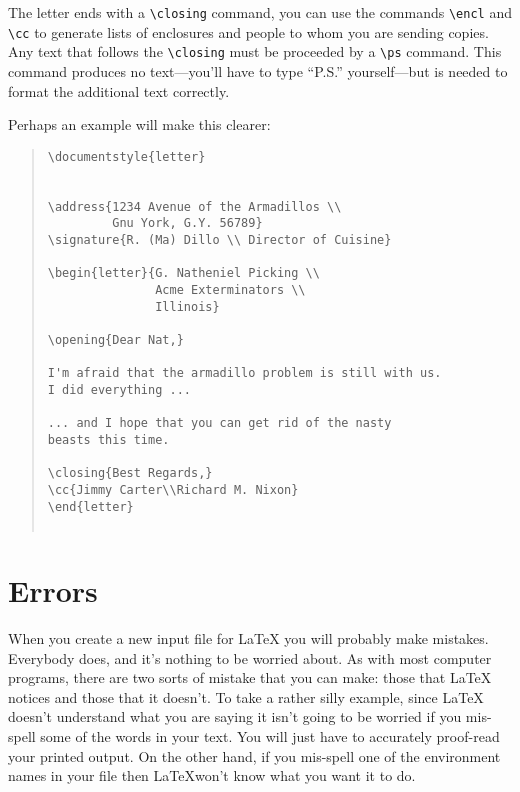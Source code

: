 The letter ends with a \verb|\closing| command, you can use the commands
\verb|\encl| and \verb|\cc| to generate lists of enclosures and people to whom
you are sending copies. Any text that follows the \verb|\closing| must be
proceeded by a \verb|\ps| command.  This command produces no text---you'll have
to type ``P.S.'' yourself---but is needed to format the additional text
correctly.

Perhaps an example will make this clearer:
\begin{quote}\footnotesize\begin{verbatim}
\documentstyle{letter}


\address{1234 Avenue of the Armadillos \\
         Gnu York, G.Y. 56789}
\signature{R. (Ma) Dillo \\ Director of Cuisine}

\begin{letter}{G. Natheniel Picking \\
               Acme Exterminators \\
               Illinois}

\opening{Dear Nat,}

I'm afraid that the armadillo problem is still with us.
I did everything ...

... and I hope that you can get rid of the nasty
beasts this time.

\closing{Best Regards,}
\cc{Jimmy Carter\\Richard M. Nixon}
\end{letter}


\end{verbatim}\end{quote}

\section{Errors}

When you create a new input file for \LaTeX{} you will probably make mistakes.
Everybody does, and it's nothing to be worried about.  As with most computer
programs, there are two sorts of mistake that you can make: those that \LaTeX{}
notices and those that it doesn't.  To take a rather silly example, since
\LaTeX{} doesn't understand what you are saying it isn't going to be worried if
you mis-spell some of the words in your text.  You will just have to accurately
proof-read your printed output.  On the other hand, if you mis-spell one of
the environment names in your file then \LaTeX won't know what you want it
to do.

